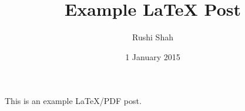 \documentclass{article}
\author{Rushi Shah}
\date{1 January 2015}
\title{Example LaTeX Post}
\begin{document}
\maketitle
This is an example LaTeX/PDF post.
\end{document}
